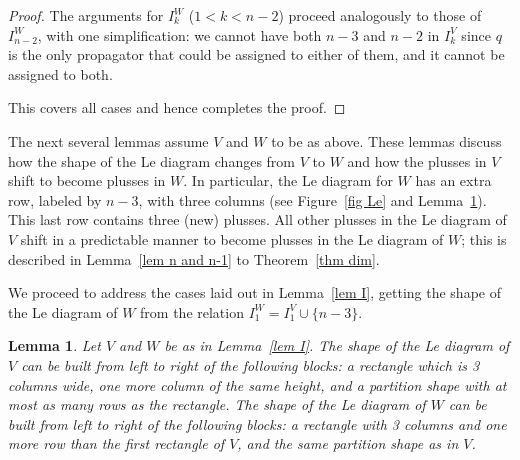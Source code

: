 \documentclass[11pt]{article}
\newtheorem{lem}[thm]{Lemma}
\theoremstyle{remark}
\theoremstyle{definition}
\begin{document}
\begin{proof}
The arguments for $I_k^{W}$ ($1< k < n-2$) proceed analogously to those of $I_{n-2}^{W}$, with one simplification: we cannot have both $n-3$ and $n-2$ in $I_k^{V}$ since $q$ is the only propagator that could be assigned to either of them, and it cannot be assigned to both.

This covers all cases and hence completes the proof.
\end{proof}

The next several lemmas assume $V$ and $W$ to be as above. These lemmas discuss how the shape of the Le diagram changes from $V$ to $W$ and how the plusses in $V$ shift to become plusses in $W$. In particular, the Le diagram for $W$ has an extra row, labeled by $n-3$, with three columns (see Figure~\ref{fig Le} and Lemma~\ref{lem shape}). This last row contains three (new) plusses. All other plusses in the Le diagram of $V$ shift in a predictable manner to become plusses in the Le diagram of $W$; this is described in Lemma~\ref{lem n and n-1} to Theorem~\ref{thm dim}.

We proceed to address the cases laid out in Lemma~\ref{lem I}, getting the shape of the Le diagram of $W$ from the relation $I_1^W= I_1^V \cup \{n-3\}$. 

\begin{lem}\label{lem shape}
  Let $V$ and $W$ be as in Lemma~\ref{lem I}.
  The shape of the Le diagram of $V$ can be built from left to right of the following blocks: a rectangle which is 3 columns wide, one more column of the same height, and a partition shape with at most as many rows as the rectangle.
  The shape of the Le diagram of $W$ can be built from left to right of the following blocks: a rectangle with 3 columns and one more row than the first rectangle of $V$, and the same partition shape as in $V$.
\end{lem}
\end{document}
